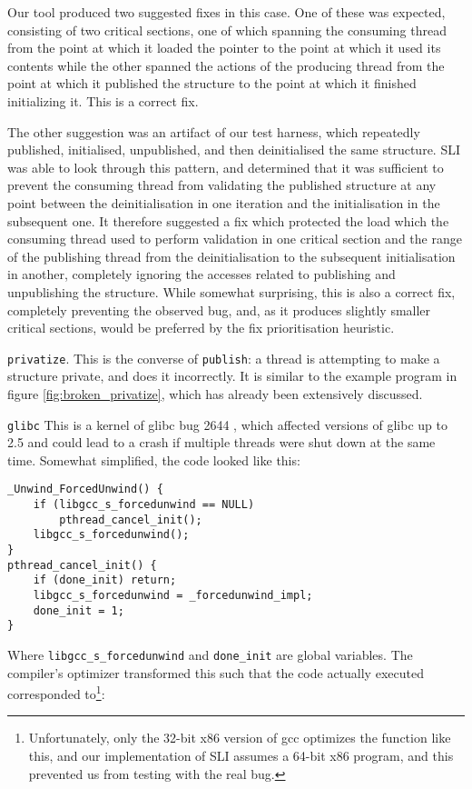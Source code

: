 \documentclass[10pt,twocolumn,preprint,natbib,authoryear]{sigplanconf}
\newcommand{\editorial}[1]{}
\newcommand{\smh}[1]{\editorial{SMH says: #1}}
\begin{document}
Our tool produced two suggested fixes in this case.  One of these was
expected, consisting of two critical sections, one of which spanning
the consuming thread from the point at which it loaded the pointer to
the point at which it used its contents while the other spanned the
actions of the producing thread from the point at which it published
the structure to the point at which it finished initializing it.  This
is a correct fix.

The other suggestion was an artifact of our test harness, which
repeatedly published, initialised, unpublished, and then deinitialised
the same structure.  SLI was able to look through this pattern, and
determined that it was sufficient to prevent the consuming thread from
validating the published structure at any point between the
deinitialisation in one iteration and the initialisation in the
subsequent one.  It therefore suggested a fix which protected the load
which the consuming thread used to perform validation in one critical
section and the range of the publishing thread from the
deinitialisation to the subsequent initialisation in another,
completely ignoring the accesses related to publishing and
unpublishing the structure.  While somewhat surprising, this is also a
correct fix, completely preventing the observed bug, and, as it
produces slightly smaller critical sections, would be preferred by the
fix prioritisation heuristic.\smh{good example of a bad fix which is
  actually good.}\editorial{ref earlier discussion of privatize
  example?}

\verb|privatize|.  This is the converse of \verb|publish|: a thread is
attempting to make a structure private, and does it incorrectly.  It
is similar to the example program in figure
\ref{fig:broken_privatize}, which has already been extensively
discussed.

\verb|glibc| This is a kernel of glibc bug 2644 \cite{glibc2644},
which affected versions of glibc up to 2.5 and could lead to a crash
if multiple threads were shut down at the same time.  Somewhat
simplified, the code looked like this:

\begin{verbatim}
_Unwind_ForcedUnwind() {
    if (libgcc_s_forcedunwind == NULL)
        pthread_cancel_init();
    libgcc_s_forcedunwind();
}
pthread_cancel_init() {
    if (done_init) return;
    libgcc_s_forcedunwind = _forcedunwind_impl;
    done_init = 1;
}
\end{verbatim}

Where \verb|libgcc_s_forcedunwind| and \verb|done_init| are global
variables.  The compiler's optimizer transformed this such that the
code actually executed corresponded to\footnote{Unfortunately, only
  the 32-bit x86 version of gcc optimizes the function like this, and
  our implementation of SLI assumes a 64-bit x86 program, and this
  prevented us from testing with the real bug.}:
\end{document}
